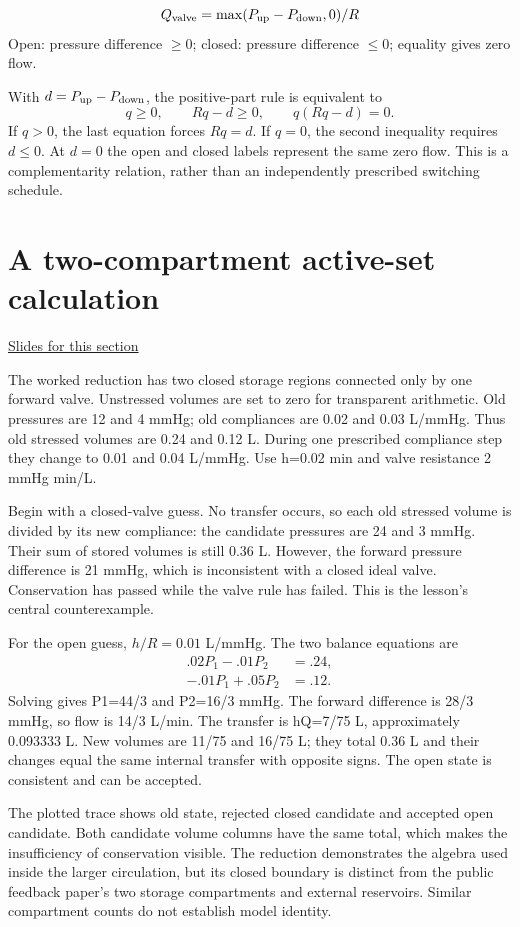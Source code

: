 \documentclass[11pt,letterpaper]{article}
\theoremstyle{definition}\newtheorem{definition}{Definition}\newtheorem{example}{Example}
\numberwithin{equation}{section}
\begin{document}
\[
Q_{\rm valve}=\max(P_{\rm up}-P_{\rm down},0)/R
\]
Open: pressure difference \ensuremath{\ge}0; closed: pressure difference \ensuremath{\le}0; equality gives zero flow.

With $d=P_{\rm up}-P_{\rm down}$, the positive-part rule is equivalent to
\[
 q\ge0,\qquad Rq-d\ge0,\qquad q(Rq-d)=0.
\]
If $q>0$, the last equation forces $Rq=d$. If $q=0$, the second inequality requires $d\le0$. At $d=0$ the open and closed labels represent the same zero flow. This is a complementarity relation, rather than an independently prescribed switching schedule.
\section{A two-compartment active-set calculation}
\hypertarget{note-a-two-compartment-active-set-calculation}{}\label{note:a-two-compartment-active-set-calculation}
{\small \href{slides.html\#frame=a-rejected-closed-candidate-panel-1\&step=1}{Slides for this section}}\par
The worked reduction has two closed storage regions connected only by one forward valve. Unstressed volumes are set to zero for transparent arithmetic. Old pressures are 12 and 4 mmHg; old compliances are 0.02 and 0.03 L/mmHg. Thus old stressed volumes are 0.24 and 0.12 L. During one prescribed compliance step they change to 0.01 and 0.04 L/mmHg. Use h=0.02 min and valve resistance 2 mmHg min/L.

Begin with a closed-valve guess. No transfer occurs, so each old stressed volume is divided by its new compliance: the candidate pressures are 24 and 3 mmHg. Their sum of stored volumes is still 0.36 L. However, the forward pressure difference is 21 mmHg, which is inconsistent with a closed ideal valve. Conservation has passed while the valve rule has failed. This is the lesson's central counterexample.

For the open guess, $h/R=0.01$ L/mmHg. The two balance equations are
\[\begin{aligned}.02P_1-.01P_2&=.24,\\-.01P_1+.05P_2&=.12.\end{aligned}\] Solving gives P1=44/3 and P2=16/3 mmHg. The forward difference is 28/3 mmHg, so flow is 14/3 L/min. The transfer is hQ=7/75 L, approximately 0.093333 L. New volumes are 11/75 and 16/75 L; they total 0.36 L and their changes equal the same internal transfer with opposite signs. The open state is consistent and can be accepted.

The plotted trace shows old state, rejected closed candidate and accepted open candidate. Both candidate volume columns have the same total, which makes the insufficiency of conservation visible. The reduction demonstrates the algebra used inside the larger circulation, but its closed boundary is distinct from the public feedback paper's two storage compartments and external reservoirs. Similar compartment counts do not establish model identity.
\end{document}
